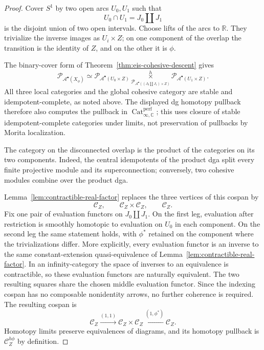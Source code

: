 \documentclass[10pt,a4paper]{amsart}
\newcommand{\C}{\mathbb C}
\newcommand{\CA}{\mathcal A}
\newcommand{\R}{\mathbb R}
\begin{document}
\begin{proof}
Cover \(S^1\) by two open arcs \(U_0,U_1\) such that
\[
U_0\cap U_1=J_0\amalg J_1
\]
is the disjoint union of two open intervals.  Choose lifts of the arcs to
\(\R\).  They trivialize the inverse images as \(U_i\times Z\); on one
component of the overlap the transition is the identity of \(Z\), and on
the other it is \(\phi\).

The binary-cover form of
Theorem~\ref{thm:eis-cohesive-descent} gives
\[
\mathcal P_{\CA^\bullet(X_\phi)}
\simeq
\mathcal P_{\CA^\bullet(U_0\times Z)}
\mathop{\times}\limits^h_{
\mathcal P_{\CA^\bullet((J_0\amalg J_1)\times Z)}
}
\mathcal P_{\CA^\bullet(U_1\times Z)}.
\]
All three local categories and the global cohesive category are stable and
idempotent-complete, as noted above.  The displayed dg homotopy pullback
therefore also computes the pullback in
\(\operatorname{Cat}^{\mathrm{perf}}_{\infty,\C}\); this uses closure of
stable idempotent-complete categories under limits, not preservation of
pullbacks by Morita localization.

The category on the disconnected overlap is the product of the categories
on its two components.  Indeed, the central idempotents of the product dga
split every finite projective module and its superconnection; conversely,
two cohesive modules combine over the product dga.

Lemma~\ref{lem:contractible-real-factor} replaces the three vertices of this
cospan by
\[
\mathcal C_Z,\qquad
\mathcal C_Z\times\mathcal C_Z,\qquad
\mathcal C_Z.
\]
Fix one pair of evaluation functors on \(J_0\amalg J_1\).  On the first
leg, evaluation after restriction is smoothly homotopic to evaluation on
\(U_0\) in each component.  On the second leg the same statement holds,
with \(\phi^*\) retained on the component where the trivializations differ.
More explicitly, every evaluation functor is an inverse to the same
constant-extension quasi-equivalence of
Lemma~\ref{lem:contractible-real-factor}.  In an infinity-category the space
of inverses to an equivalence is contractible, so these evaluation functors
are naturally equivalent.  The two resulting squares share the chosen
middle evaluation functor.  Since the indexing cospan has no composable
nonidentity arrows, no further coherence is required.  The resulting
cospan is
\[
\mathcal C_Z
\xrightarrow{(1,1)}
\mathcal C_Z\times\mathcal C_Z
\xleftarrow{(1,\phi^*)}
\mathcal C_Z.
\]
Homotopy limits preserve equivalences of diagrams, and its homotopy
pullback is \(\mathcal C_Z^{h\phi}\) by definition.
\end{proof}
\end{document}
